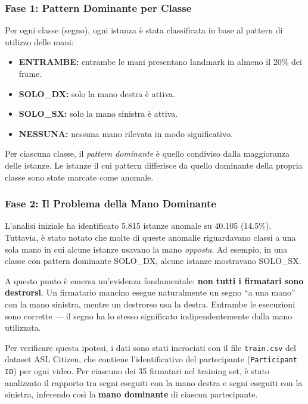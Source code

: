 \subsubsection{Fase 1: Pattern Dominante per Classe}

Per ogni classe (segno), ogni istanza è stata classificata in base al pattern di utilizzo delle mani:

\begin{itemize}
    \item \textbf{ENTRAMBE:} entrambe le mani presentano landmark in almeno il 20\% dei frame.
    \item \textbf{SOLO\_DX:} solo la mano destra è attiva.
    \item \textbf{SOLO\_SX:} solo la mano sinistra è attiva.
    \item \textbf{NESSUNA:} nessuna mano rilevata in modo significativo.
\end{itemize}

Per ciascuna classe, il \textit{pattern dominante} è quello condiviso dalla maggioranza delle istanze. Le istanze il cui pattern differisce da quello dominante della propria classe sono state marcate come anomale.

\subsubsection{Fase 2: Il Problema della Mano Dominante}

L'analisi iniziale ha identificato 5.815 istanze anomale su 40.105 (14.5\%). Tuttavia, è stato notato che molte di queste anomalie riguardavano classi a una sola mano in cui alcune istanze usavano la mano \textit{opposta}. Ad esempio, in una classe con pattern dominante SOLO\_DX, alcune istanze mostravano SOLO\_SX.

A questo punto è emersa un'evidenza fondamentale: \textbf{non tutti i firmatari sono destrorsi}. Un firmatario mancino esegue naturalmente un segno ``a una mano'' con la mano sinistra, mentre un destrorso usa la destra. Entrambe le esecuzioni sono corrette --- il segno ha lo stesso significato indipendentemente dalla mano utilizzata.

Per verificare questa ipotesi, i dati sono stati incrociati con il file \texttt{train.csv} del dataset ASL Citizen, che contiene l'identificativo del partecipante (\texttt{Participant ID}) per ogni video. Per ciascuno dei 35 firmatari nel training set, è stato analizzato il rapporto tra segni eseguiti con la mano destra e segni eseguiti con la sinistra, inferendo così la \textbf{mano dominante} di ciascun partecipante.

